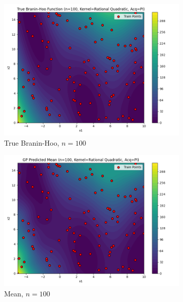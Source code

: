 \documentclass[a4paper,12pt]{article}
\begin{document}
\begin{figure}[H]
\begin{subfigure}{0.3\textwidth}
  \includegraphics[width=\linewidth]{Task-02/images/true_function_rational_quadratic_n100_PI.png}
  \caption{True Branin-Hoo, $n=100$}
\end{subfigure}
\begin{subfigure}{0.3\textwidth}
    \includegraphics[width=\linewidth]{Task-02/images/gp_mean_rational_quadratic_n100_PI.png}
    \caption{Mean, $n=100$}
\end{subfigure}
\begin{subfigure}{0.3\textwidth}

\end{subfigure}
\end{figure}
\end{document}
